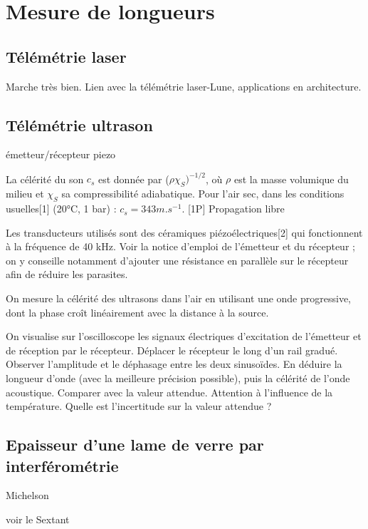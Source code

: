 \documentclass{article}%
\begin{document}
\section{Mesure de longueurs}
\subsection{Télémétrie laser}

Marche très bien. Lien avec la télémétrie laser-Lune, applications en architecture.
\subsection{Télémétrie ultrason}
émetteur/récepteur piezo

La célérité du son $c_{s}$ est donnée par ($\rho \chi_{S} )^{ - 1 / 2}$, où $\rho$ est la masse volumique du milieu et $\chi_{S}$ sa compressibilité adiabatique. Pour l'air sec, dans les conditions usuelles[1] (20°C, 1 bar) :  $c_{s} = 343  m.s^{ - 1}$.
[1P] Propagation libre

Les transducteurs utilisés sont des céramiques piézoélectriques[2] qui fonctionnent à la fréquence de  40  kHz. Voir la notice d'emploi de l'émetteur et du récepteur ; on y conseille notamment d'ajouter une résistance en parallèle sur le récepteur afin de réduire les parasites.

On mesure la célérité des ultrasons dans l'air en utilisant une onde progressive, dont la phase croît linéairement avec la distance à la source.

On visualise sur l'oscilloscope les signaux électriques d'excitation de l'émetteur et de réception par le récepteur. Déplacer le récepteur le long d'un rail gradué. Observer l'amplitude et le déphasage entre les deux sinusoïdes. En déduire la longueur d'onde (avec la meilleure précision possible), puis la célérité de l'onde acoustique. Comparer avec la valeur attendue. Attention à l'influence de la température. Quelle est l'incertitude sur la valeur attendue ? 

\subsection{Epaisseur d'une lame de verre par interférométrie}
Michelson

voir le Sextant
\end{document}
